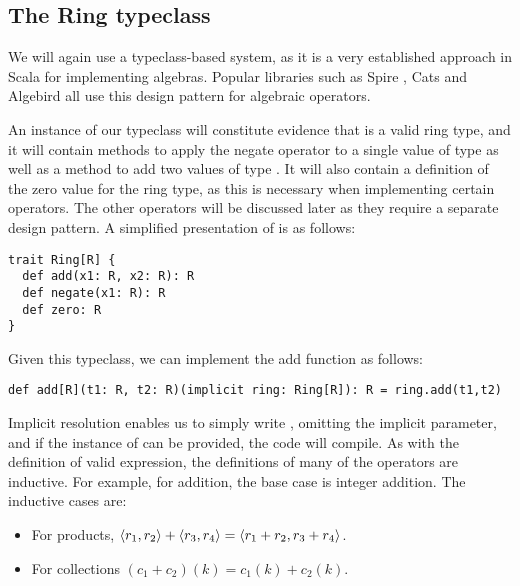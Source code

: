 \subsection{The Ring typeclass} \label{ringtypeclass}

We will again use a typeclass-based system, as it is a very established approach in Scala for implementing algebras. Popular libraries such as Spire \cite{spire}, Cats \cite{cats} and Algebird \cite{algebird} all use this design pattern for algebraic operators.

An instance of our typeclass  will constitute evidence that  is a valid ring type, and it will contain methods to apply the negate operator to a single value of type  as well as a method to add two values of type . It will also contain a definition of the zero value for the ring type, as this is necessary when implementing certain operators. The other operators will be discussed later as they require a separate design pattern. A simplified presentation of  is as follows:
\vs
\begin{lstlisting}
trait Ring[R] {
  def add(x1: R, x2: R): R
  def negate(x1: R): R
  def zero: R
}
\end{lstlisting}\vs
Given this typeclass, we can implement the add function as follows:
\vs\begin{lstlisting}
def add[R](t1: R, t2: R)(implicit ring: Ring[R]): R = ring.add(t1,t2)
\end{lstlisting}\vs
Implicit resolution enables us to simply write , omitting the implicit parameter, and if the instance of  can be provided, the code will compile. As with the definition of valid expression, the definitions of many of the operators are inductive. For example, for addition, the base case is integer addition. The inductive cases are:
\begin{itemize}
\item{For products, $\langle r_1, r_2 \rangle + \langle r_3, r_4 \rangle = \langle r_1 + r_2, r_3 + r_4 \rangle$.}
\item{For collections $(c_1 + c_2)(k) = c_1(k) + c_2(k)$.}
\end{itemize}

